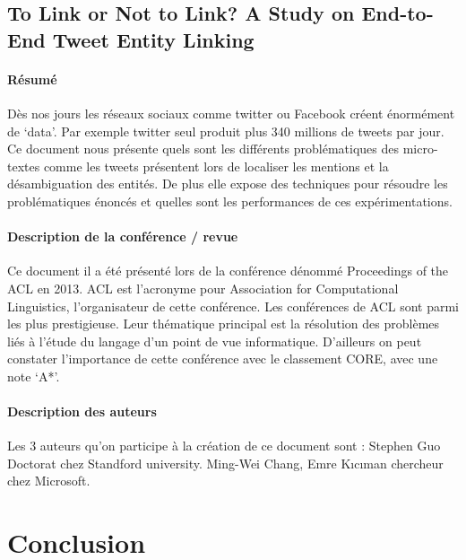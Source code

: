 \documentclass{article}
\begin{document}
\subsection{To Link or Not to Link? A Study on End-to-End Tweet Entity Linking \cite{article-15}}

\paragraph{Résumé}
Dès nos jours les réseaux sociaux comme twitter ou Facebook créent énormément de ‘data’. Par exemple twitter seul produit plus 340 millions de tweets par jour. Ce document nous présente quels sont les différents problématiques des micro-textes comme les tweets présentent lors de localiser les mentions et la désambiguation des entités. De plus elle expose des techniques pour résoudre les problématiques énoncés et quelles sont les performances de ces expérimentations.


\paragraph{Description de la conférence / revue}
Ce document il a été présenté lors de la conférence dénommé Proceedings of the ACL en 2013. ACL est l’acronyme pour Association for Computational Linguistics, l’organisateur de cette conférence.
Les conférences de ACL sont parmi les plus prestigieuse. Leur thématique principal est la résolution des problèmes liés à l’étude du langage d’un point de vue informatique. 
D’ailleurs on peut constater l’importance de cette conférence avec le classement CORE, avec une note ‘A*’.


\paragraph{Description des auteurs}
Les 3 auteurs qu’on participe à la création de ce document sont :
Stephen Guo Doctorat chez Standford university.
Ming-Wei Chang, Emre Kıcıman chercheur chez Microsoft. 




\section{Conclusion}








\end{document}

